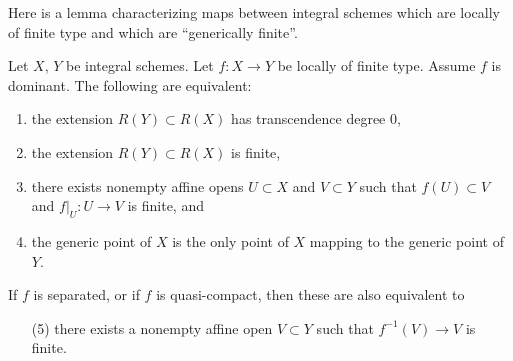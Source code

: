 \noindent
Here is a lemma characterizing maps between integral schemes
which are locally of finite type and which are ``generically finite''.

\begin{lemma}
\label{lemma-finite-degree}
Let $X$, $Y$ be integral schemes.
Let $f : X \to Y$ be locally of finite type.
Assume $f$ is dominant.
The following are equivalent:
\begin{enumerate}
\item the extension $R(Y) \subset R(X)$ has
transcendence degree $0$,
\item the extension $R(Y) \subset R(X)$ is finite,
\item there exists nonempty affine opens $U \subset X$
and $V \subset Y$ such that $f(U) \subset V$
and $f|_U : U \to V$ is finite, and
\item the generic point of $X$ is the only point of $X$ mapping to
the generic point of $Y$.
\end{enumerate}
If $f$ is separated, or if $f$ is quasi-compact, then these are
also equivalent to
\begin{enumerate}
\item[(5)] there exists a nonempty affine open $V \subset Y$ such
that $f^{-1}(V) \to V$ is finite.
\end{enumerate}
\end{lemma}

